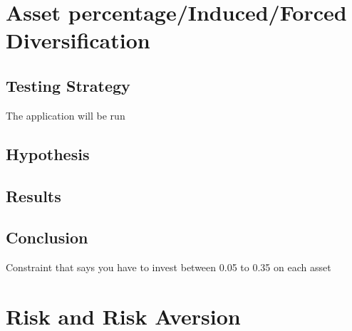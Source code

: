 \documentclass{pdfmx4020}
\begin{document}
      

      

      


  \section{Asset percentage/Induced/Forced Diversification} %
  \label{sec:asset_percentage}

    \subsection{Testing Strategy}
      The application will be run

    \subsection{Hypothesis}

    \subsection{Results}

    \subsection{Conclusion}

    Constraint that says you have to invest between 0.05 to 0.35 on each asset

  \section{Risk and Risk Aversion} %
  \label{sec:risk_and_risk_aversion}
\end{document}
